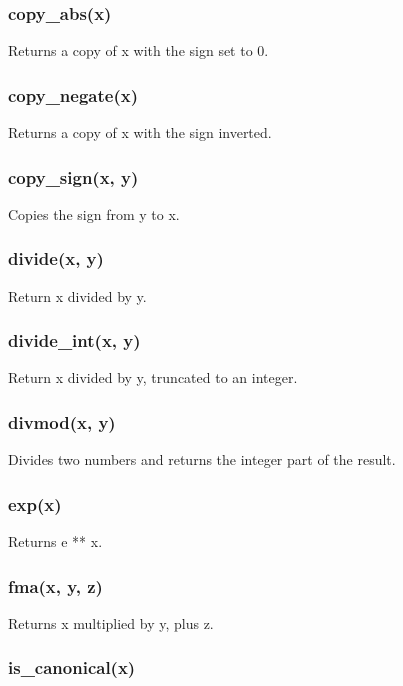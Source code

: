 \subsubsection{copy\_abs(x)}

Returns a copy of x with the sign set to 0.

\subsubsection{copy\_negate(x)}

Returns a copy of x with the sign inverted.

\subsubsection{copy\_sign(x, y)}

Copies the sign from y to x.

\subsubsection{divide(x, y)}

Return x divided by y.

\subsubsection{divide\_int(x, y)}

Return x divided by y, truncated to an integer.

\subsubsection{divmod(x, y)}

Divides two numbers and returns the integer part of the result.

\subsubsection{exp(x)}

Returns e ** x.

\subsubsection{fma(x, y, z)}

Returns x multiplied by y, plus z.

\subsubsection{is\_canonical(x)}

